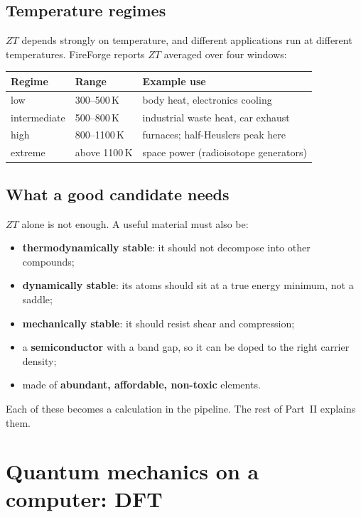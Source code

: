\documentclass[11pt,a4paper]{report}
\begin{document}
\section{Temperature regimes}

$ZT$ depends strongly on temperature, and different applications run at different
temperatures. FireForge reports $ZT$ averaged over four windows:

\begin{center}
\begin{tabular}{lll}
\toprule
Regime & Range & Example use \\
\midrule
low & 300--500\,K & body heat, electronics cooling \\
intermediate & 500--800\,K & industrial waste heat, car exhaust \\
high & 800--1100\,K & furnaces; half-Heuslers peak here \\
extreme & above 1100\,K & space power (radioisotope generators) \\
\bottomrule
\end{tabular}
\end{center}

\section{What a good candidate needs}

$ZT$ alone is not enough. A useful material must also be:
\begin{itemize}
\item \textbf{thermodynamically stable}: it should not decompose into other compounds;
\item \textbf{dynamically stable}: its atoms should sit at a true energy minimum, not a saddle;
\item \textbf{mechanically stable}: it should resist shear and compression;
\item a \textbf{semiconductor} with a band gap, so it can be doped to the right carrier density;
\item made of \textbf{abundant, affordable, non-toxic} elements.
\end{itemize}
Each of these becomes a calculation in the pipeline. The rest of Part~II explains them.

\chapter{Quantum mechanics on a computer: DFT}
\label{ch:dft}
\end{document}
